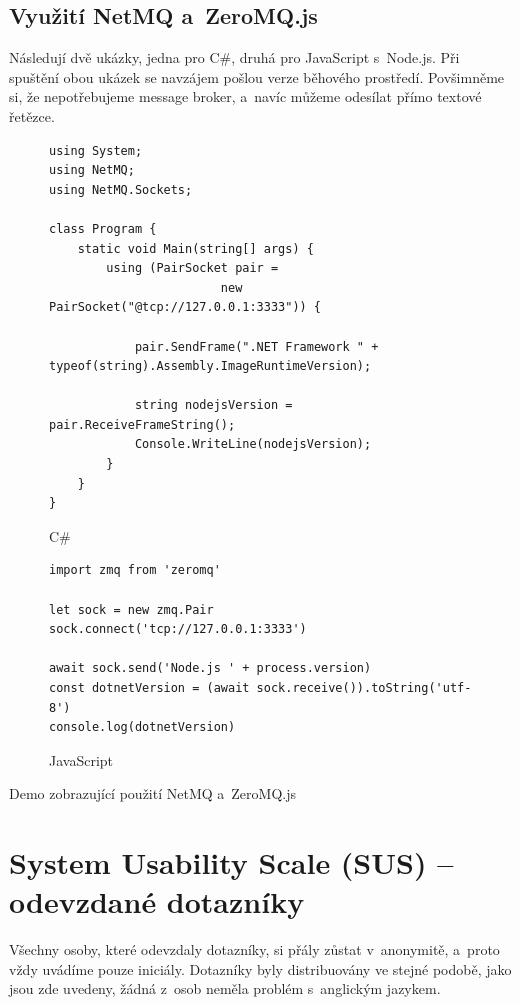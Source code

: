 \documentclass[12pt, a4paper, twoside]{article}
\newcommand{\codefigureSpacing}{1.2}
\begin{document}
   \subsection{Využití NetMQ a~ZeroMQ.js}
   \label{sub_sec:zeromqDemo}
    Následují dvě ukázky, jedna pro C\#, druhá pro JavaScript s~Node.js. Při spuštění obou ukázek se navzájem pošlou verze běhového prostředí. Povšimněme si, že nepotřebujeme message broker, a~navíc můžeme odesílat přímo textové řetězce.
\begin{codefigure}[H]
\renewcommand\baselinestretch{\codefigureSpacing}
	\begin{subfigure}[t]{\textwidth}
	\begin{lstlisting}[style=MyCSharp]
using System;
using NetMQ;
using NetMQ.Sockets;

class Program {
	static void Main(string[] args)	{
		using (PairSocket pair = 
						new PairSocket("@tcp://127.0.0.1:3333")) {
							
			pair.SendFrame(".NET Framework " + typeof(string).Assembly.ImageRuntimeVersion);
			
			string nodejsVersion = pair.ReceiveFrameString();
			Console.WriteLine(nodejsVersion);
		}
	}	
}
	\end{lstlisting}
	\caption{C\#}
	\end{subfigure}
\end{codefigure}
   	\begin{codefigure}[H] \ContinuedFloat
   	\renewcommand\baselinestretch{\codefigureSpacing}
   		\begin{subfigure}[t]{\textwidth}
	   	\begin{lstlisting}[style=MyJavaScript]
import zmq from 'zeromq'

let sock = new zmq.Pair
sock.connect('tcp://127.0.0.1:3333')

await sock.send('Node.js ' + process.version)
const dotnetVersion = (await sock.receive()).toString('utf-8')
console.log(dotnetVersion)
       \end{lstlisting}
   \caption{JavaScript}
   \end{subfigure}
	\caption{Demo zobrazující použití NetMQ a~ZeroMQ.js}
   	\end{codefigure}
    \section{System Usability Scale (SUS) -- odevzdané dotazníky}
    \label{appx:sus}
    Všechny osoby, které odevzdaly dotazníky, si přály zůstat v~anonymitě, a~proto vždy uvádíme pouze iniciály. Dotazníky byly distribuovány ve stejné podobě, jako jsou zde uvedeny, žádná z~osob neměla problém s~anglickým jazykem.
    
\end{document}
